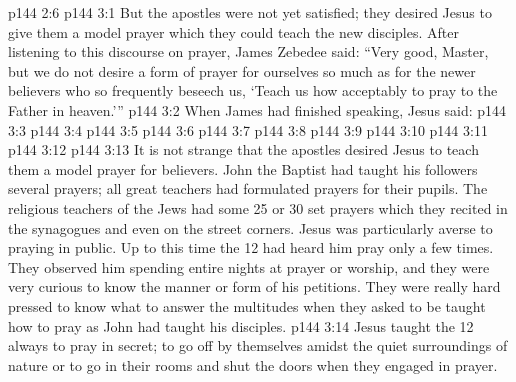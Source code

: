 \vs p144 2:6 
\vs p144 3:1 But the apostles were not yet satisfied; they desired Jesus to give them a model prayer which they could teach the new disciples. After listening to this discourse on prayer, James Zebedee said: “Very good, Master, but we do not desire a form of prayer for ourselves so much as for the newer believers who so frequently beseech us, ‘Teach us how acceptably to pray to the Father in heaven.’”
\vs p144 3:2 When James had finished speaking, Jesus said: 
\vsetoff
\vs p144 3:3 
\vs p144 3:4 \hsetoff {}
\vs p144 3:5 
\vs p144 3:6 \hsetoff {}
\vs p144 3:7 
\vs p144 3:8 \hsetoff {}
\vs p144 3:9 
\vs p144 3:10 \hsetoff {}
\vs p144 3:11 
\vs p144 3:12 \hsetoff {}
\vsetoff
\vs p144 3:13 \pc It is not strange that the apostles desired Jesus to teach them a model prayer for believers. John the Baptist had taught his followers several prayers; all great teachers had formulated prayers for their pupils. The religious teachers of the Jews had some 25 or 30 set prayers which they recited in the synagogues and even on the street corners. Jesus was particularly averse to praying in public. Up to this time the 12 had heard him pray only a few times. They observed him spending entire nights at prayer or worship, and they were very curious to know the manner or form of his petitions. They were really hard pressed to know what to answer the multitudes when they asked to be taught how to pray as John had taught his disciples.
\vs p144 3:14 Jesus taught the 12 always to pray in secret; to go off by themselves amidst the quiet surroundings of nature or to go in their rooms and shut the doors when they engaged in prayer.
